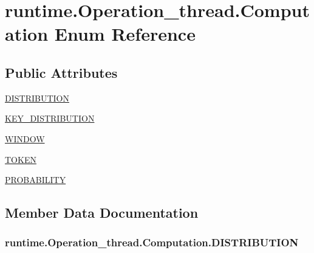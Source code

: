 \hypertarget{enumruntime_1_1_operation__thread_1_1_computation}{}\section{runtime.\+Operation\+\_\+thread.\+Computation Enum Reference}
\label{enumruntime_1_1_operation__thread_1_1_computation}
\subsection*{Public Attributes}
\begin{DoxyCompactItemize}
\item 
\hyperlink{enumruntime_1_1_operation__thread_1_1_computation_a6381fe8b51eee311dff627d315fefbfd}{D\+I\+S\+T\+R\+I\+B\+U\+T\+I\+ON}
\item 
\hyperlink{enumruntime_1_1_operation__thread_1_1_computation_a8235775e9276cd32feb00cd4ca2e0a35}{K\+E\+Y\+\_\+\+D\+I\+S\+T\+R\+I\+B\+U\+T\+I\+ON}
\item 
\hyperlink{enumruntime_1_1_operation__thread_1_1_computation_aa6eb3addd3d9b5c6002a65ad02b48558}{W\+I\+N\+D\+OW}
\item 
\hyperlink{enumruntime_1_1_operation__thread_1_1_computation_a67a1e69588a63abbde225f5a249623c5}{T\+O\+K\+EN}
\item 
\hyperlink{enumruntime_1_1_operation__thread_1_1_computation_abe18ce6bfa0196cd62df7cb6fb7a9427}{P\+R\+O\+B\+A\+B\+I\+L\+I\+TY}
\end{DoxyCompactItemize}


\subsection{Member Data Documentation}
\subsubsection[{\texorpdfstring{D\+I\+S\+T\+R\+I\+B\+U\+T\+I\+ON}{DISTRIBUTION}}]{\setlength{\rightskip}{0pt plus 5cm}runtime.\+Operation\+\_\+thread.\+Computation.\+D\+I\+S\+T\+R\+I\+B\+U\+T\+I\+ON}\hypertarget{enumruntime_1_1_operation__thread_1_1_computation_a6381fe8b51eee311dff627d315fefbfd}{}\label{enumruntime_1_1_operation__thread_1_1_computation_a6381fe8b51eee311dff627d315fefbfd}
